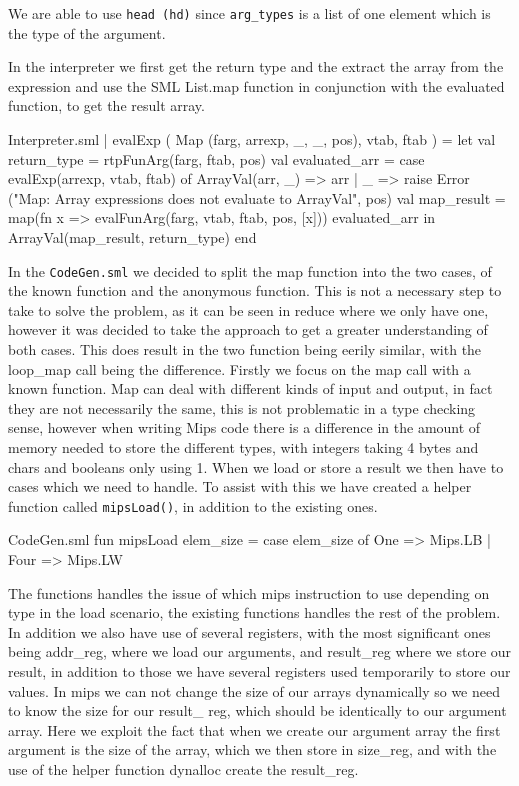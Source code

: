 \documentclass[11pt,a4paper,oneside]{report}
\begin{document}
We are able to use \texttt{head (hd)} since \texttt{arg\_types} is a list of one element which is the type of the argument.

In the interpreter we first get the return type and the extract the array from the expression and use the SML List.map function in conjunction with the evaluated function, to get the result array.

\begin{code}[firstnumber=294]{Interpreter.sml}
  | evalExp ( Map (farg, arrexp, _, _, pos), vtab, ftab ) =
    let
      val return_type = rtpFunArg(farg, ftab, pos)
      val evaluated_arr = case evalExp(arrexp, vtab, ftab) of
        ArrayVal(arr, _) => arr
        | _ => raise Error
        ("Map: Array expressions does not evaluate to ArrayVal", pos)
      val map_result =
      map(fn x => evalFunArg(farg, vtab, ftab, pos, [x])) evaluated_arr
    in
      ArrayVal(map_result, return_type)
    end
\end{code}

In the \texttt{CodeGen.sml} we decided to split the map function into the two cases, of the known function and the anonymous function. This is not a necessary step to take to solve the problem, as it can be seen in reduce where we only have one, however it was decided to take the approach to get a greater understanding of both cases. This does result in the two function being eerily similar, with the loop\_map call being the difference.
Firstly we focus on the map call with a known function. Map can deal with different kinds of input and output, in fact they are not necessarily the same, this is not problematic in a type checking sense, however when writing Mips code there is a difference in the amount of memory needed to store the different types, with integers taking 4 bytes and chars and booleans only using 1. When we load or store a result we then have to cases which we need to handle. To assist with this we have created a helper function called \texttt{mipsLoad()}, in addition to the existing ones.
\begin{code}[firstnumber=81]{CodeGen.sml}
fun mipsLoad elem_size = case elem_size of
                              One => Mips.LB
                            | Four => Mips.LW
\end{code}
The functions handles the issue of which mips instruction to use depending on type in the load scenario, the existing functions handles the rest of the problem.
In addition we also have use of several registers, with the most significant ones being addr\_reg, where we load our arguments, and result\_reg where we store our result, in addition to those we have several registers used temporarily to store our values. In mips we can not change the size of our arrays dynamically so we need to know the size for our result\_ reg, which should be identically to our argument array. Here we exploit the fact that when we create our argument array the first argument is the size of the array, which we then store in size\_reg, and with the use of the helper function dynalloc create the result\_reg.
\end{document}
